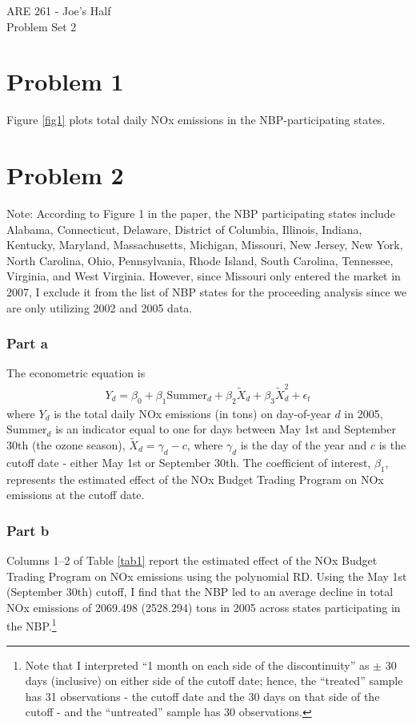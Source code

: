 \documentclass[12pt]{article}
\begin{document}
\begin{center}
ARE 261 - Joe's Half \\
Problem Set 2
\end{center}

\section*{Problem 1}
Figure \ref{fig1} plots total daily NOx emissions in the NBP-participating states.

\section*{Problem 2}
Note: According to Figure 1 in the paper, the NBP participating states include Alabama, Connecticut, Delaware, District of Columbia, Illinois, Indiana, Kentucky, Maryland, Massachusetts, Michigan, Missouri, New Jersey, New York, North Carolina, Ohio, Pennsylvania, Rhode Island, South Carolina, Tennessee, Virginia, and West Virginia. However, since Missouri only entered the market in 2007, I exclude it from the list of NBP states for the proceeding analysis since we are only utilizing 2002 and 2005 data.

\subsubsection*{Part a}
The econometric equation is
\begin{align}
	Y_d = \beta_0 + \beta_1 \text{Summer}_d + \beta_2 \tilde{X}_d + \beta_3 \tilde{X}_d^2 + \epsilon_t
\end{align}
where $Y_d$ is the total daily NOx emissions (in tons) on day-of-year $d$ in 2005, $\text{Summer}_d$ is an indicator equal to one for days between May 1st and September 30th (the ozone season), $\tilde{X}_d = \gamma_d - c$, where $\gamma_d$ is the day of the year and $c$ is the cutoff date - either May 1st or September 30th. The coefficient of interest, $\beta_1$, represents the estimated effect of the NOx Budget Trading Program on NOx emissions at the cutoff date.

\subsubsection*{Part b}
Columns 1--2 of Table \ref{tab1} report the estimated effect of the NOx Budget Trading Program on NOx emissions using the polynomial RD. Using the May 1st (September 30th) cutoff, I find that the NBP led to an average decline in total NOx emissions of 2069.498 (2528.294) tons in 2005 across states participating in the NBP.\footnote{Note that I interpreted ``1 month on each side of the discontinuity'' as $\pm$ 30 days (inclusive) on either side of the cutoff date; hence, the ``treated'' sample has 31 observations - the cutoff date and the 30 days on that side of the cutoff - and the ``untreated'' sample has 30 observations.}
\end{document}
